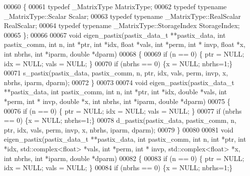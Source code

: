 \begin{DoxyCode}
00060   \{
00061     \textcolor{keyword}{typedef} \_MatrixType MatrixType;
00062     \textcolor{keyword}{typedef} \textcolor{keyword}{typename} \_MatrixType::Scalar Scalar;
00063     \textcolor{keyword}{typedef} \textcolor{keyword}{typename} \_MatrixType::RealScalar RealScalar;
00064     \textcolor{keyword}{typedef} \textcolor{keyword}{typename} \_MatrixType::StorageIndex StorageIndex;
00065   \};
00066   
00067   \textcolor{keywordtype}{void} eigen\_pastix(pastix\_data\_t **pastix\_data, \textcolor{keywordtype}{int} pastix\_comm, \textcolor{keywordtype}{int} n, \textcolor{keywordtype}{int} *ptr, \textcolor{keywordtype}{int} *idx, \textcolor{keywordtype}{float} *vals, \textcolor{keywordtype}{
      int} *perm, \textcolor{keywordtype}{int} * invp, \textcolor{keywordtype}{float} *x, \textcolor{keywordtype}{int} nbrhs, \textcolor{keywordtype}{int} *iparm, \textcolor{keywordtype}{double} *dparm)
00068   \{
00069     \textcolor{keywordflow}{if} (n == 0) \{ ptr = NULL; idx = NULL; vals = NULL; \}
00070     \textcolor{keywordflow}{if} (nbrhs == 0) \{x = NULL; nbrhs=1;\}
00071     s\_pastix(pastix\_data, pastix\_comm, n, ptr, idx, vals, perm, invp, x, nbrhs, iparm, dparm); 
00072   \}
00073   
00074   \textcolor{keywordtype}{void} eigen\_pastix(pastix\_data\_t **pastix\_data, \textcolor{keywordtype}{int} pastix\_comm, \textcolor{keywordtype}{int} n, \textcolor{keywordtype}{int} *ptr, \textcolor{keywordtype}{int} *idx, \textcolor{keywordtype}{double} *vals, \textcolor{keywordtype}{
      int} *perm, \textcolor{keywordtype}{int} * invp, \textcolor{keywordtype}{double} *x, \textcolor{keywordtype}{int} nbrhs, \textcolor{keywordtype}{int} *iparm, \textcolor{keywordtype}{double} *dparm)
00075   \{
00076     \textcolor{keywordflow}{if} (n == 0) \{ ptr = NULL; idx = NULL; vals = NULL; \}
00077     \textcolor{keywordflow}{if} (nbrhs == 0) \{x = NULL; nbrhs=1;\}
00078     d\_pastix(pastix\_data, pastix\_comm, n, ptr, idx, vals, perm, invp, x, nbrhs, iparm, dparm); 
00079   \}
00080   
00081   \textcolor{keywordtype}{void} eigen\_pastix(pastix\_data\_t **pastix\_data, \textcolor{keywordtype}{int} pastix\_comm, \textcolor{keywordtype}{int} n, \textcolor{keywordtype}{int} *ptr, \textcolor{keywordtype}{int} *idx, 
      std::complex<float> *vals, \textcolor{keywordtype}{int} *perm, \textcolor{keywordtype}{int} * invp, std::complex<float> *x, \textcolor{keywordtype}{int} nbrhs, \textcolor{keywordtype}{int} *iparm, \textcolor{keywordtype}{double} *dparm)
00082   \{
00083     \textcolor{keywordflow}{if} (n == 0) \{ ptr = NULL; idx = NULL; vals = NULL; \}
00084     \textcolor{keywordflow}{if} (nbrhs == 0) \{x = NULL; nbrhs=1;\}

\end{DoxyCode}

